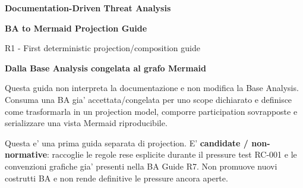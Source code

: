 \documentclass[11pt,a4paper]{article}
\begin{document}
\fancyfoot[C]{}

\begin{titlepage}
\thispagestyle{empty}
\vspace*{12mm}
{\sffamily\bfseries\color{DDTANavy}\fontsize{15}{18}\selectfont Documentation-Driven Threat Analysis}\par
\vspace{5mm}
{\sffamily\bfseries\color{DDTANavy}\fontsize{26}{30}\selectfont BA to Mermaid Projection Guide}\par
\vspace{2mm}
{\sffamily\color{DDTABlue}\fontsize{18}{22}\selectfont R1 - First deterministic projection/composition guide}\par

\vspace{14mm}
\begin{tcolorbox}[enhanced,arc=3pt,boxrule=0pt,colback=DDTANavy,left=13pt,right=13pt,top=12pt,bottom=12pt]
{\color{white}\sffamily\bfseries\large Dalla Base Analysis congelata al grafo Mermaid}\par
\vspace{2mm}
{\color{white!88}\small Questa guida non interpreta la documentazione e non modifica la Base Analysis. Consuma una BA gia' accettata/congelata per uno scope dichiarato e definisce come trasformarla in un projection model, comporre participation sovrapposte e serializzare una vista Mermaid riproducibile.}
\end{tcolorbox}

\vspace{6mm}
\begin{ddtaopen}[title={STATO DEL DOCUMENTO}]
Questa e' una prima guida separata di projection. E' \textbf{candidate / non-normative}: raccoglie le regole rese esplicite durante il pressure test RC-001 e le convenzioni grafiche gia' presenti nella BA Guide R7. Non promuove nuovi costrutti BA e non rende definitive le pressure ancora aperte.
\end{ddtaopen}


\end{titlepage}
\end{document}
